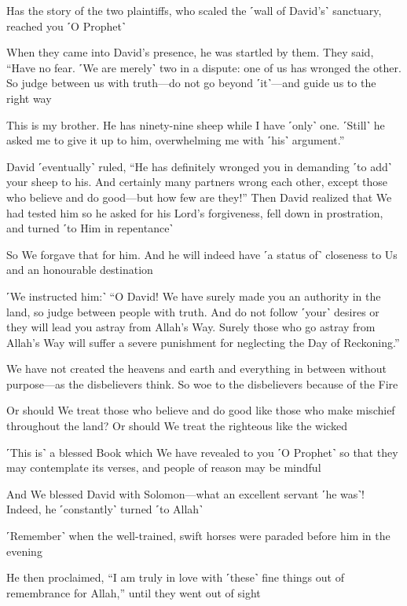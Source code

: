 Has the story of the two plaintiffs, who scaled the ˹wall of David’s˺ sanctuary, reached you ˹O Prophet˺

When they came into David’s presence, he was startled by them. They said, “Have no fear. ˹We are merely˺ two in a dispute: one of us has wronged the other. So judge between us with truth—do not go beyond ˹it˺—and guide us to the right way

This is my brother. He has ninety-nine sheep while I have ˹only˺ one. ˹Still˺ he asked me to give it up to him, overwhelming me with ˹his˺ argument.”

David ˹eventually˺ ruled, “He has definitely wronged you in demanding ˹to add˺ your sheep to his. And certainly many partners wrong each other, except those who believe and do good—but how few are they!” Then David realized that We had tested him so he asked for his Lord’s forgiveness, fell down in prostration, and turned ˹to Him in repentance˺

So We forgave that for him. And he will indeed have ˹a status of˺ closeness to Us and an honourable destination

˹We instructed him:˺ “O David! We have surely made you an authority in the land, so judge between people with truth. And do not follow ˹your˺ desires or they will lead you astray from Allah’s Way. Surely those who go astray from Allah’s Way will suffer a severe punishment for neglecting the Day of Reckoning.”

We have not created the heavens and earth and everything in between without purpose—as the disbelievers think. So woe to the disbelievers because of the Fire

Or should We treat those who believe and do good like those who make mischief throughout the land? Or should We treat the righteous like the wicked

˹This is˺ a blessed Book which We have revealed to you ˹O Prophet˺ so that they may contemplate its verses, and people of reason may be mindful

And We blessed David with Solomon—what an excellent servant ˹he was˺! Indeed, he ˹constantly˺ turned ˹to Allah˺

˹Remember˺ when the well-trained, swift horses were paraded before him in the evening

He then proclaimed, “I am truly in love with ˹these˺ fine things out of remembrance for Allah,” until they went out of sight


